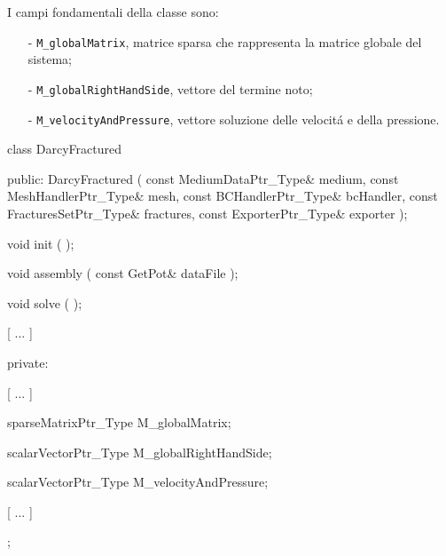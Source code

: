 \noindent I campi fondamentali della classe sono:
	\begin{enumerate}
	\item[-] \texttt{M\_globalMatrix}, matrice sparsa che rappresenta la matrice globale del sistema;
	\item[-] \texttt{M\_globalRightHandSide}, vettore del termine noto;
	\item[-] \texttt{M\_velocityAndPressure}, vettore soluzione delle velocit\'{a} e della pressione.
	\end{enumerate} 

\begin{Code03_04}[caption={Classe \texttt{DarcyFracture}}]
class DarcyFractured
{
 public:
    DarcyFractured ( const MediumDataPtr_Type& medium,
                     const MeshHandlerPtr_Type& mesh,
                     const BCHandlerPtr_Type& bcHandler,
                     const FracturesSetPtr_Type& fractures,
                     const ExporterPtr_Type& exporter );
    
    void init ( );
    
    void assembly ( const GetPot& dataFile );

    void solve ( );

	[ ... ]

 private:

	[ ... ]

    sparseMatrixPtr_Type M_globalMatrix;

    scalarVectorPtr_Type M_globalRightHandSide;

    scalarVectorPtr_Type M_velocityAndPressure;

    [ ... ]
};
\end{Code03_04}

